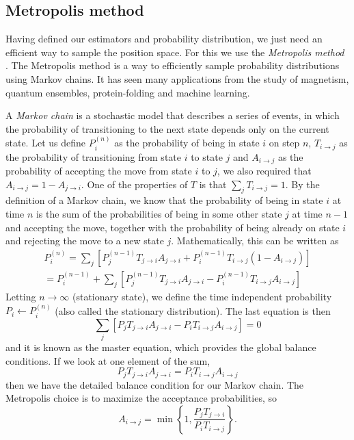 \documentclass[aps,reprint,superscriptaddress,nofootinbib]{revtex4-2}
\begin{document}
\subsection*{Metropolis method}

    Having defined our estimators and probability distribution, we just need an efficient way to sample the position space. For this we use the \textit{Metropolis method} \cite{metropolis_1953}. The Metropolis method is a way to efficiently sample probability distributions using Markov chains. It has seen many applications from the study of magnetism, quantum ensembles, protein-folding and machine learning.
    
    A \textit{Markov chain} is a stochastic model that describes a series of events, in which the probability of transitioning to the next state depends only on the current state. Let us define \(P_i^{(n)}\) as the probability of being in state \(i\) on step \(n\), \(T_{i \rightarrow j}\) as the probability of transitioning from state \(i\) to state \(j\) and \(A_{i \rightarrow j}\) as the probability of accepting the move from state \(i\) to \(j\), we also required that \(A_{i \rightarrow j} = 1 - A_{j \rightarrow i}\). One of the properties of \(T\) is that \(\sum_j T_{i \rightarrow j} = 1\). By the definition of a Markov chain, we know that the probability of being in state \(i\) at time \(n\) is the sum of the probabilities of being in some other state \(j\) at time \(n-1\) and accepting the move, together with the probability of being already on state \(i\) and rejecting the move to a new state \(j\). Mathematically, this can be written as 
    \begin{align*}
        P_i^{(n)} = \sum_j \left[ P_j^{(n-1)} T_{j \rightarrow i} A_{j \rightarrow i} + P_i^{(n-1)} T_{i \rightarrow j} (1 - A_{i \rightarrow j}) \right] \\
        = P_i^{(n-1)} + \sum_j \left[ P_j^{(n-1)} T_{j \rightarrow i} A_{j \rightarrow i} - P_i^{(n-1)} T_{i \rightarrow j} A_{i \rightarrow j} \right]
    \end{align*}
    Letting \(n \rightarrow \infty\) (stationary state), we define the time independent probability \(P_i \leftarrow P_i^{(n)}\) (also called the stationary distribution). The last equation is then
    \begin{equation*}
        \sum_j \left[ P_j T_{j \rightarrow i} A_{j \rightarrow i} - P_i T_{i \rightarrow j} A_{i \rightarrow j} \right] = 0
    \end{equation*}
    and it is known as the master equation, which provides the global balance conditions. If we look at one element of the sum,
    \begin{equation*}
        P_j T_{j \rightarrow i} A_{j \rightarrow i} = P_i T_{i \rightarrow j} A_{i \rightarrow j}
    \end{equation*}
    then we have the detailed balance condition for our Markov chain. The Metropolis choice is to maximize the acceptance probabilities, so 
    \begin{equation*}
        A_{i \rightarrow j} = \min \left\{ 1, \frac{P_j T_{j \rightarrow i}}{P_i T_{i \rightarrow j}} \right\}.
    \end{equation*}
    
\end{document}
